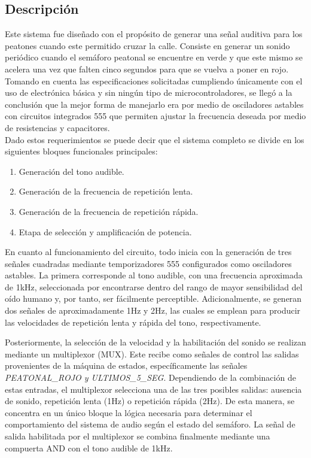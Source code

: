 \documentclass[12pt, journal, onecolumn]{IEEEtran}
\begin{document}
\subsection{Descripción}
Este sistema fue diseñado con el propósito de generar una señal auditiva para los peatones cuando este permitido cruzar la calle. Consiste en generar un sonido periódico cuando el semáforo peatonal se encuentre en verde y que este mismo se acelera una vez que falten cinco segundos para que se vuelva a poner en rojo. \\

Tomando en cuenta las especificaciones solicitadas cumpliendo únicamente con el uso de electrónica básica y sin ningún tipo de microcontroladores, se llegó a la conclusión que la mejor forma de manejarlo era por medio de osciladores astables con circuitos integrados 555 que permiten ajustar la frecuencia deseada por medio de resistencias y capacitores.\\

Dado estos requerimientos se puede decir que el sistema completo se divide en los siguientes bloques funcionales principales:
\begin{enumerate}
    \item Generación del tono audible.
    \item Generación de la frecuencia de repetición lenta.
    \item Generación de la frecuencia de repetición rápida.
    \item Etapa de selección y amplificación de potencia.
\end{enumerate}

En cuanto al funcionamiento del circuito, todo inicia con la generación de tres señales cuadradas mediante temporizadores 555 configurados como osciladores astables. La primera corresponde al tono audible, con una frecuencia aproximada de 1kHz, seleccionada por encontrarse dentro del rango de mayor sensibilidad del oído humano y, por tanto, ser fácilmente perceptible. Adicionalmente, se generan dos señales de aproximadamente 1Hz y 2Hz, las cuales se emplean para producir las velocidades de repetición lenta y rápida del tono, respectivamente.

Posteriormente, la selección de la velocidad y la habilitación del sonido se realizan mediante un multiplexor (MUX). Este recibe como señales de control las salidas provenientes de la máquina de estados, específicamente las señales \textit{PEATONAL\_ROJO y ULTIMOS\_5\_SEG}. Dependiendo de la combinación de estas entradas, el multiplexor selecciona una de las tres posibles salidas: ausencia de sonido, repetición lenta (1Hz) o repetición rápida (2Hz). De esta manera, se concentra en un único bloque la lógica necesaria para determinar el comportamiento del sistema de audio según el estado del semáforo. La señal de salida habilitada por el multiplexor se combina finalmente mediante una compuerta AND con el tono audible de 1kHz.
\end{document}
